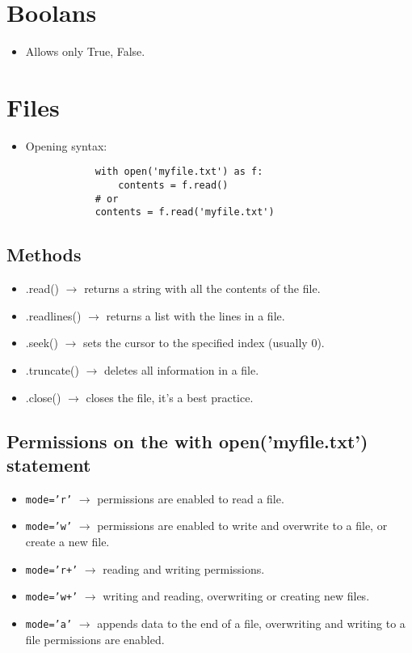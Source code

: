 \section{Boolans}
\begin{itemize}
    \item Allows only True, False. 
\end{itemize}

\section{Files}
\begin{itemize}
    \item Opening syntax: 
        \begin{verbatim}
            with open('myfile.txt') as f: 
                contents = f.read()
            # or
            contents = f.read('myfile.txt')
        \end{verbatim}
\end{itemize}
\subsection{Methods}
\begin{itemize}
    \item .read() $\rightarrow$ returns a string with all the contents of the file. 
    \item .readlines() $\rightarrow$ returns a list with the lines in a file. 
    \item .seek() $\rightarrow$ sets the cursor to the specified index (usually 0).
    \item .truncate() $\rightarrow$ deletes all information in a file. 
    \item .close() $\rightarrow$ closes the file, it's a best practice. 
\end{itemize}
\subsection{Permissions on the with open('myfile.txt') statement }
\begin{itemize}
    \item \texttt{mode='r'} $\rightarrow$ permissions are enabled to read a file. 
    \item \texttt{mode='w'} $\rightarrow$ permissions are enabled to write and overwrite to a file, or create a new file. 
    \item \texttt{mode='r+'} $\rightarrow$ reading and writing permissions.
    \item \texttt{mode='w+'} $\rightarrow$ writing and reading, overwriting or creating new files. 
    \item \texttt{mode='a'} $\rightarrow$ appends data to the end of a file, overwriting and writing to a file permissions are enabled. 
\end{itemize}

